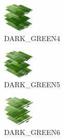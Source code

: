 \hspace{0.1cm}
\begin{minipage}[b]{0.15\linewidth}
\begin{figure}[H]                                                          
  \centering                                                             
  \begin{adjustbox}{width=1.5cm,center}                                   
  \includegraphics[width=1.5cm]{src/colorspace_colourflow/flows/colourflow_212-45.png}%
  \end{adjustbox}                                                        
\caption*{DARK\_GREEN4}                                           
\end{figure}                                                               
\end{minipage}
\hspace{0.1cm}
\begin{minipage}[b]{0.15\linewidth}
\begin{figure}[H]                                                          
  \centering                                                             
  \begin{adjustbox}{width=1.5cm,center}                                   
  \includegraphics[width=1.5cm]{src/colorspace_colourflow/flows/colourflow_213-45.png}%
  \end{adjustbox}                                                        
\caption*{DARK\_GREEN5}                                           
\end{figure}                                                               
\end{minipage}
\hspace{0.1cm}
\begin{minipage}[b]{0.15\linewidth}
\begin{figure}[H]                                                          
  \centering                                                             
  \begin{adjustbox}{width=1.5cm,center}                                   
  \includegraphics[width=1.5cm]{src/colorspace_colourflow/flows/colourflow_214-45.png}%
  \end{adjustbox}                                                        
\caption*{DARK\_GREEN6}                                           
\end{figure}                                                               
\end{minipage}

